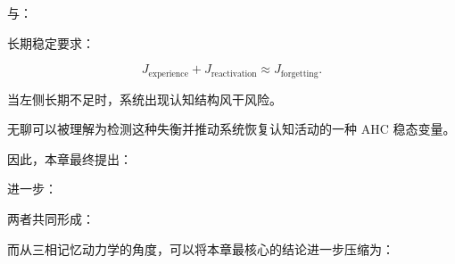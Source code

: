 与：

\begin{statementbox}
\centering
{}
\end{statementbox}

长期稳定要求：

\[
\boxed{
J_{\mathrm{experience}}
+
J_{\mathrm{reactivation}}
\approx
J_{\mathrm{forgetting}}.
}
\]

当左侧长期不足时，系统出现认知结构风干风险。

无聊可以被理解为检测这种失衡并推动系统恢复认知活动的一种 AHC 稳态变量。

因此，本章最终提出：

\begin{statementbox}
\centering
{}
\end{statementbox}

进一步：

\begin{statementbox}
\centering
{}
\end{statementbox}

两者共同形成：

\begin{statementbox}
\centering
{}
\end{statementbox}

而从三相记忆动力学的角度，可以将本章最核心的结论进一步压缩为：

\begin{statementbox}
\centering
{}
\end{statementbox}